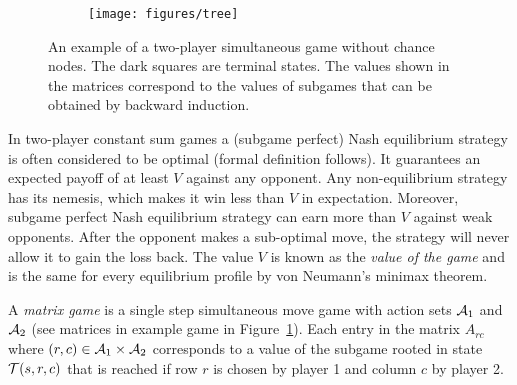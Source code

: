 \begin{figure}[t!]
\centering
\begin{subfigure}{12cm}
\centering
\texttt{[image: figures/tree]}\\
\end{subfigure}%
\caption{An example of a two-player simultaneous game without chance nodes.%
The dark squares are terminal states. The values shown in the matrices correspond to the values of subgames that can be obtained by backward induction.\\
\label{fig:example}}
\end{figure}
In two-player constant sum games a (subgame perfect) Nash equilibrium strategy is often considered to be optimal (formal definition follows).
It guarantees an expected payoff of at least $V$ against any opponent. Any non-equilibrium strategy has its nemesis, which makes it win less
than $V$ in expectation. Moreover, subgame perfect Nash equilibrium strategy can earn more than $V$ against weak opponents. After the
opponent makes a sub-optimal move, the strategy will never allow it to gain the loss back.
The value $V$ is known as the \emph{value of the game} and is the same for every equilibrium profile by von Neumann's minimax theorem.

A {\it matrix game} is a single step simultaneous move game with action sets $\mathcal{A}_1$ and $\mathcal{A}_2$ (see matrices in example game in Figure~\ref{fig:example}).
Each entry in the matrix $A_{rc}$ where $(r,c) \in \mathcal{A}_1 \times \mathcal{A}_2$ corresponds to a value of the subgame rooted in state $\mathcal{T}(s,r,c)$ that is reached if row $r$ is chosen by player 1 and column $c$ by player 2.

